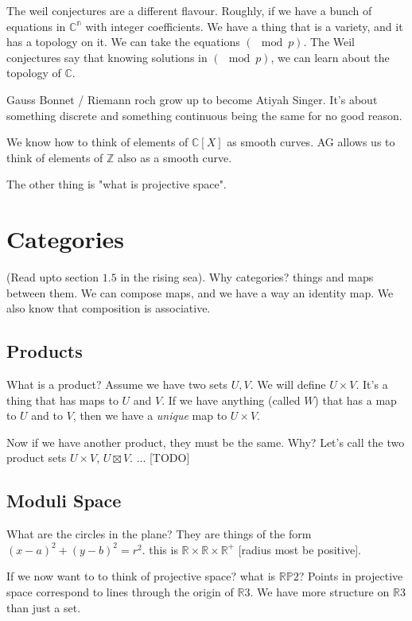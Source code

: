 \documentclass{book}
\newcommand{\R}{\ensuremath{\mathbb{R}}}
\newcommand{\RP}{\ensuremath{\mathbb{RP}}}
\theoremstyle{definition}
\begin{document}
The weil conjectures are a different flavour. Roughly, if we have a bunch
of equations in $\mathbb{C^n}$ with integer coefficients. We have a thing
that is a variety, and it has a topology on it. We can take the equations
$(\mod p)$. The Weil conjectures say that knowing solutions in $(\mod p)$, we can
learn about the topology of $\mathbb {C}$.

Gauss Bonnet / Riemann roch grow up to become Atiyah Singer. It's about something
discrete and something continuous being the same for no good reason.


We know how to think of elements of $\mathbb C[X]$ as smooth curves. AG allows
us to think of elements of $\mathbb Z$ also as a smooth curve.

The other thing is "what is projective space".

\section{Categories}

(Read upto section $1.5$ in the rising sea). Why categories? things and maps
between them. We can compose maps, and we have a way an identity map. We also
know that composition is associative.

\subsection{Products}
What is a product? Assume we have two sets $U, V$. We will define $U \times V$.
It's a thing that has maps to $U$ and $V$. If we have anything (called $W$) that has a map to $U$
and to $V$, then we have a \emph{unique} map to $U \times V$.

Now if we have another product, they must be the same. Why? Let's call the
two product sets $U \times V$, $U \boxtimes V$. ... [TODO]

\subsection{Moduli Space}

What are the circles in the plane? They are things of the form $(x - a)^2 + (y - b)^2 = r^2$.
this is $\R \times \R \times \R^+$ [radius most be positive].

If we now want to to think of projective space? what is $\RP2$? Points in projective
space correspond to lines through the origin of $\R3$. We have more structure on $\R3$
than just a set.
\end{document}
